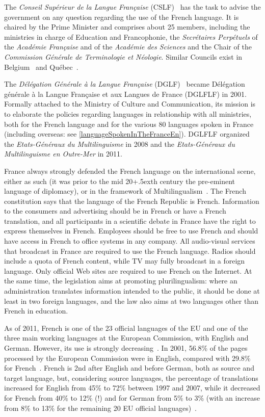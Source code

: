 \begin{multicols}{2}
The {\em Conseil Supérieur de la Langue Française} (CSLF)~\cite{cslf} has the task to
advise the government on any question regarding the use of the French
language. It is chaired by the Prime Minister and comprises about 25
members, including the ministries in charge of Education and
Francophonie, the {\em Secrétaires Perpétuels} of the {\em Académie Française} and
of the {\em Académie des Sciences} and the Chair of the {\em Commission Générale
de Terminologie et Néologie}. Similar Councils exist in Belgium~\cite{belgique} and
Québec~\cite{quebec}.

The {\em Délégation Générale à la Langue Française} (DGLF)~\cite{dglf} became
Délégation générale à la Langue Française et aux Langues de France
(DGLFLF) in 2001. Formally attached to the Ministry of Culture and
Communication, its mission is to elaborate the policies regarding
languages in relationship with all ministries, both for the French
language and for the various 80 languages spoken in France (including
overseas: see \ref{languageSpokenInTheFranceEn}). DGLFLF organized the {\em Etats-Généraux du
Multilinguisme} in 2008 and the {\em Etats-Généraux du
Multilinguisme en Outre-Mer} in 2011.

France always strongly defended the French language on the
international scene, either as such (it was prior to the mid 20\raise+.5ex\hbox{th}
century the pre-eminent language of diplomacy), or in the framework of
Multilingualism~\cite{multilinguisme}. The French constitution says
that the language of the French Republic is French. Information to the
consumers and advertising should be in French or have a French
translation, and all participants in a scientific debate in France
have the right to express themselves in French. Employees should be
free to use French and should have access in French to office systems
in any company. All audio-visual services that broadcast in France are
required to use the French language. Radios should include a quota
of French content, while TV may fully broadcast in a foreign
language. Only official Web sites are required to use French on the
Internet. At the same time, the legislation aims at promoting
plurilingualism: where an administration translates information
intended to the public, it should be done at least in two foreign
languages, and the law also aims at two languages other than French in
education.

As of 2011, French is one of the 23 official languages of the EU and one
of the three main working languages at the European Commission, with
English and German. However, its use is strongly decreasing~\cite{baisse}. In 2001,
56.8\% of the pages processed by the European Commission were in
English, compared with 29.8\% for French~\cite{francais}. French is 2nd after
English and before German, both as source and target language, but,
considering source languages, the percentage of translations increased
for English from 45\% to 72\% between 1997 and 2007, while it
decreased for French from 40\% to 12\% (!) and for German from 5\% to
3\% (with an increase from 8\% to 13\% for the remaining 20 EU
official languages)~\cite{dgt08}.


\end{multicols}
